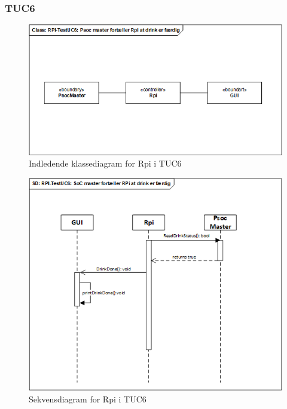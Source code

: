 \subsubsection{TUC6}

\begin{figure}[H]
    \centering
    \includegraphics[width=1\textwidth]{Images/Applikationsmodeller/rpi/rpi_klassediagramTestUC6.png}
    \caption{Indledende klassediagram for Rpi i TUC6}
    \label{fig:cdTUC6Rpi}
\end{figure}

\begin{figure}[H]
    \centering
    \includegraphics[width=1\textwidth]{Images/Applikationsmodeller/rpi/rpi_sekvensdiagramTestUC6.png}
    \caption{Sekvensdiagram for Rpi i TUC6}
    \label{fig:sdTUC6Rpi}
\end{figure}

